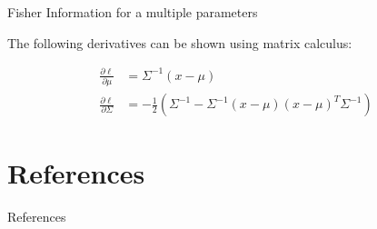 \documentclass[aspectratio=1610]{beamer}					%
\begin{document}
\begin{frame}{Fisher Information for a multiple parameters}

The following derivatives can be shown using matrix calculus:

\begin{align*}
\frac{\partial\ell}{\partial\mu} &= \Sigma^{-1}(x-\mu)\\
\frac{\partial\ell}{\partial\Sigma} &= -\frac{1}{2}\left(\Sigma^{-1} - \Sigma^{-1}(x-\mu)(x-\mu)^{T}\Sigma^{-1}\right)
\end{align*}


\end{frame}

\section{References}

\begin{frame}[allowframebreaks]{References}
	\tiny
	
\end{frame}
\end{document}
